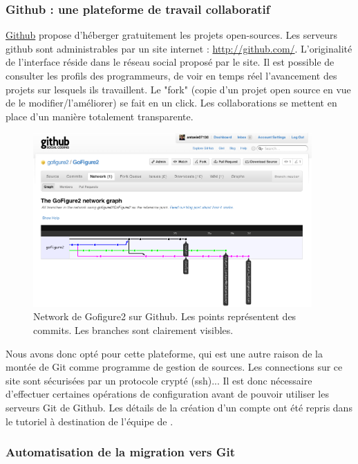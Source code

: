 \subsubsection*{Github : une plateforme de travail collaboratif}

\href{https://github.com/}{Github} propose d'héberger gratuitement les projets open-sources. Les serveurs github sont administrables par un site
internet : \url{http://github.com/}. L'originalité de l'interface réside dans le réseau social proposé par le site. Il est possible de consulter les profils des programmeurs, de voir en temps réel l'avancement des projets sur lesquels ils travaillent. Le "fork" (copie d'un projet open source en vue de le modifier/l'améliorer) se fait en un click. Les collaborations se mettent en place d'un manière totalement transparente.
\begin{figure}[h]
\begin{center}
\leavevmode
\includegraphics[width=0.95\textwidth]{pictures/GitGithub}
\end{center}
\caption{Network de Gofigure2 sur Github. Les points représentent des commits. Les branches sont clairement visibles.}
\label{fig:GitGithub}
\end{figure}
Nous avons donc opté pour cette plateforme, qui est une autre raison de la montée de Git comme programme de gestion de sources. Les connections sur ce site sont sécurisées par un protocole crypté (ssh)... Il est donc nécessaire d'effectuer certaines opérations de configuration avant de pouvoir utiliser les serveurs Git de Github. Les détails de la création d'un compte ont été repris dans le tutoriel à destination de l'équipe de {\gofigure}.

\subsubsection*{Automatisation de la migration vers Git}

